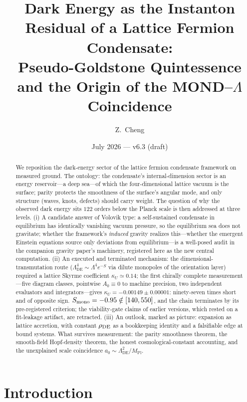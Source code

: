 \documentclass[11pt]{article}
\title{Dark Energy as the Instanton Residual of a Lattice Fermion
Condensate:\\
Pseudo-Goldstone Quintessence and the Origin of the
MOND--$\Lambda$ Coincidence}
\author{Z.~Cheng}
\date{July 2026 --- v6.3 (draft)}
\newcommand{\Mpl}{M_{\mathrm{Pl}}}
\newcommand{\LDE}{\Lambda_{\mathrm{DE}}}
\begin{document}
\maketitle

\begin{abstract}
We reposition the dark-energy sector of the lattice fermion condensate
framework on measured ground.  The ontology: the condensate's
internal-dimension sector is an energy reservoir---a deep sea---of
which the four-dimensional lattice vacuum is the surface; parity
protects the smoothness of the surface's angular mode, and only
structure (waves, knots, defects) should carry weight.
The question of why the observed dark energy sits $122$ orders below
the Planck scale is then addressed at three levels.
(i) A candidate answer of Volovik type: a self-sustained condensate in
equilibrium has identically vanishing vacuum pressure, so the
equilibrium sea does not gravitate; whether the framework's
\emph{induced} gravity realizes this---whether the emergent Einstein
equations source only deviations from equilibrium---is a well-posed
audit in the companion gravity paper's machinery, registered here as
the new central computation.
(ii) An executed and terminated mechanism: the dimensional-transmutation
route ($\LDE^4 \sim \Lambda^4 e^{-S}$ via dilute monopoles of the
orientation layer) required a lattice Skyrme coefficient
$\kappa_U \simeq 0.14$; the first chirally complete measurement---five
diagram classes, pointwise $A_0 \equiv 0$ to machine precision, two
independent evaluators and integrators---gives
$\kappa_U = -0.00149 \pm 0.00001$: ninety-seven times short and of
opposite sign.  $S_{\rm mono} = -0.95 \notin [140,550]$, and the chain
terminates by its pre-registered criterion; the viability-gate claims
of earlier versions, which rested on a fit-leakage artifact, are
retracted.
(iii) An outlook, marked as picture: expansion as lattice
accretion, with constant $\rho_{\rm DE}$ as a bookkeeping identity
and a falsifiable edge at bound systems.
What survives measurement: the parity smoothness theorem, the
smooth-field Hopf-density theorem, the honest cosmological-constant
accounting, and the unexplained scale coincidence
$a_0 \sim \LDE^2/\Mpl$.
\end{abstract}

\section{Introduction}
\label{sec:intro}
\end{document}
